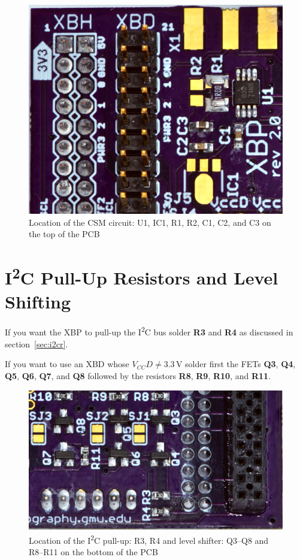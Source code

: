 \documentclass[twoside,11pt]{cergdoc}
\newcommand{\ITwoC}{I\textsuperscript{2}C }
\begin{document}
\begin{figure}[ht]
  \begin{center}
    \includegraphics[scale=0.8]{figures/xbp-ina225}
    \caption{Location of the CSM circuit: U1, IC1, R1, R2, C1, C2, and C3 on the top of the PCB}
  \end{center}
\end{figure}

\section{\ITwoC Pull-Up Resistors and Level Shifting}

If you want the XBP to pull-up the \ITwoC bus solder \textbf{R3} and \textbf{R4}
as discussed in section~\ref{sec:i2cr}. 

If you want to use an XBD whose $V_{CC}D \ne 3.3\,\mathrm{V}$ solder first the
FETs \textbf{Q3}, \textbf{Q4}, \textbf{Q5}, \textbf{Q6}, \textbf{Q7}, and \textbf{Q8}
followed by the resistors \textbf{R8}, \textbf{R9}, \textbf{R10}, and \textbf{R11}.

\begin{figure}[ht]
  \begin{center}
    \includegraphics[scale=1]{figures/xbp-i2c-circuit}
    \caption{Location of the \ITwoC pull-up: R3, R4 and level shifter: Q3--Q8 and R8--R11 on the bottom of the PCB}
  \end{center}
\end{figure}
\end{document}
